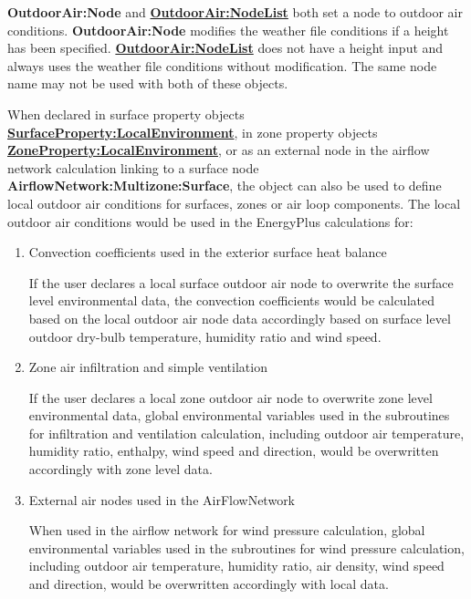 \textbf{OutdoorAir:Node} and \textbf{\hyperref[outdoorairnodelist]{OutdoorAir:\hyperref[nodelist]{NodeList}}} both set a node to outdoor air conditions. \textbf{OutdoorAir:Node} modifies the weather file conditions if a height has been specified. \textbf{\hyperref[outdoorairnodelist]{OutdoorAir:\hyperref[nodelist]{NodeList}}} does not have a height input and always uses the weather file conditions without modification. The same node name may not be used with both of these objects.

When declared in surface property objects \textbf{\hyperref[surfacePropertylocalEnvironment]{SurfaceProperty:LocalEnvironment}}, in zone property objects \textbf{\hyperref[ZonePropertylocalEnvironment]{ZoneProperty:LocalEnvironment}}, or as an external node in the airflow network calculation linking to a surface node \textbf{AirflowNetwork:Multizone:Surface}, the object can also be used to define local outdoor air conditions for surfaces, zones or air loop components. The local outdoor air conditions would be used in the EnergyPlus calculations for:
\begin{enumerate}
\item Convection coefficients used in the exterior surface heat balance

If the user declares a local surface outdoor air node to overwrite the surface level environmental data, the convection coefficients would be calculated based on the local outdoor air node data accordingly based on surface level outdoor dry-bulb temperature, humidity ratio and wind speed.

\item Zone air infiltration and simple ventilation

If the user declares a local zone outdoor air node to overwrite zone level environmental data, global environmental variables used in the subroutines for infiltration and ventilation calculation, including outdoor air temperature, humidity ratio, enthalpy, wind speed and direction, would be overwritten accordingly with zone level data.

\item External air nodes used in the AirFlowNetwork

When used in the airflow network for wind pressure calculation, global environmental variables used in the subroutines for wind pressure calculation, including outdoor air temperature, humidity ratio, air density, wind speed and direction, would be overwritten accordingly with local data.

\end{enumerate}

